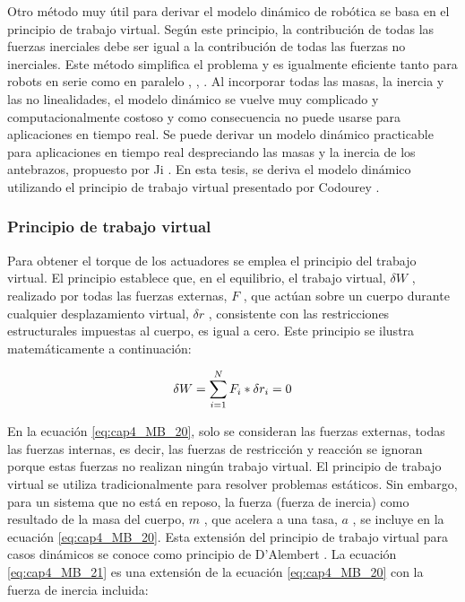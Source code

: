         Otro método muy útil para derivar el modelo dinámico de robótica se basa en el principio de trabajo virtual. Según este principio, la contribución de todas las fuerzas inerciales debe ser igual a la contribución de todas las fuerzas no inerciales. Este método simplifica el problema y es igualmente eficiente tanto para robots en serie como en paralelo \cite{Codourey:31400}, \cite{bodyoriente}, \cite{zhang1993efficient}. Al incorporar todas las masas, la inercia y las no linealidades, el modelo dinámico se vuelve muy complicado y computacionalmente costoso y como consecuencia no puede usarse para aplicaciones en tiempo real. Se puede derivar un modelo dinámico practicable para aplicaciones en tiempo real despreciando las masas y la inercia de los antebrazos, propuesto por Ji \cite{StudyinertiaStewart}. En esta tesis, se deriva el modelo dinámico utilizando el principio de trabajo virtual presentado por Codourey \cite{Codourey_decoupling}.      
        \newpage


        \subsubsection{Principio de trabajo virtual}

        Para obtener el torque de los actuadores se emplea el principio del trabajo virtual. El principio establece que, en el equilibrio, el trabajo virtual,  $\delta W$  , realizado por todas las fuerzas externas, $F$ , que actúan sobre un cuerpo durante cualquier desplazamiento virtual,  $\delta r $  , consistente con las restricciones estructurales impuestas al cuerpo, es igual a cero. Este principio se ilustra matemáticamente a continuación:
        
        \begin{equation}
            \delta W= \sum _{i=1}^{N}F_{i} \ast \delta r_{i}=0\\
            \label{eq:cap4_MB_20}
        \end{equation}

        
        En la ecuación \ref{eq:cap4_MB_20}, solo se consideran las fuerzas externas, todas las fuerzas internas, es decir, las fuerzas de restricción y reacción se ignoran porque estas fuerzas no realizan ningún trabajo virtual. El principio de trabajo virtual se utiliza tradicionalmente para resolver problemas estáticos. Sin embargo, para un sistema que no está en reposo, la fuerza (fuerza de inercia) como resultado de la masa del cuerpo,  \( m \) , que acelera a una tasa,  \( a \) , se incluye en la ecuación \ref{eq:cap4_MB_20}. Esta extensión del principio de trabajo virtual para casos dinámicos se conoce como principio de D'Alembert \cite{dynamic_omega3}. La ecuación \ref{eq:cap4_MB_21} es una extensión de  la ecuación \ref{eq:cap4_MB_20} con la fuerza de inercia incluida:
        
